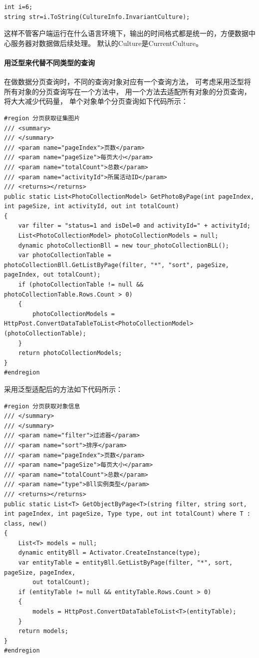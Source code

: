 \documentclass{book}
\begin{document}
\begin{lstlisting}[language={[Sharp]C}]
int i=6;
string str=i.ToString(CultureInfo.InvariantCulture);
\end{lstlisting}

这样不管客户端运行在什么语言环境下，输出的时间格式都是统一的，方便数据中心服务器对数据做后续处理。
默认的Culture是CurrentCulture。

\paragraph{用泛型来代替不同类型的查询}在做数据分页查询时，不同的查询对象对应有一个查询方法，
可考虑采用泛型将所有对象的分页查询写在一个方法中，
用一个方法去适配所有对象的分页查询，将大大减少代码量，
单个对象单个分页查询如下代码所示：

\begin{lstlisting}[language={[Sharp]C},caption=单个对象分页查询]
#region 分页获取征集图片
/// <summary>
/// </summary>
/// <param name="pageIndex">页数</param>
/// <param name="pageSize">每页大小</param>
/// <param name="totalCount">总数</param>
/// <param name="activityId">所属活动ID</param>
/// <returns></returns>
public static List<PhotoCollectionModel> GetPhotoByPage(int pageIndex, int pageSize, int activityId, out int totalCount)
{
    var filter = "status=1 and isDel=0 and activityId=" + activityId;
    List<PhotoCollectionModel> photoCollectionModels = null;
    dynamic photoCollectionBll = new tour_photoCollectionBLL();
    var photoCollectionTable = photoCollectionBll.GetListByPage(filter, "*", "sort", pageSize, pageIndex, out totalCount);
    if (photoCollectionTable != null && photoCollectionTable.Rows.Count > 0)
    {
        photoCollectionModels = HttpPost.ConvertDataTableToList<PhotoCollectionModel>(photoCollectionTable);
    }
    return photoCollectionModels;
}
#endregion
\end{lstlisting}

采用泛型适配后的方法如下代码所示：

\begin{lstlisting}[language={[Sharp]C},caption=泛型查询方法适配所有对象的分页查询]
#region 分页获取对象信息
/// </summary>
/// </summary>
/// <param name="filter">过滤器</param>
/// <param name="sort">排序</param>
/// <param name="pageIndex">页数</param>
/// <param name="pageSize">每页大小</param>
/// <param name="totalCount">总数</param>
/// <param name="type">Bll实例类型</param>
/// <returns></returns>
public static List<T> GetObjectByPage<T>(string filter, string sort, int pageIndex, int pageSize, Type type, out int totalCount) where T : class, new()
{
    List<T> models = null;
    dynamic entityBll = Activator.CreateInstance(type);
    var entityTable = entityBll.GetListByPage(filter, "*", sort, pageSize, pageIndex,
        out totalCount);
    if (entityTable != null && entityTable.Rows.Count > 0)
    {
        models = HttpPost.ConvertDataTableToList<T>(entityTable);
    }
    return models;
}
#endregion
\end{lstlisting}
\end{document}
